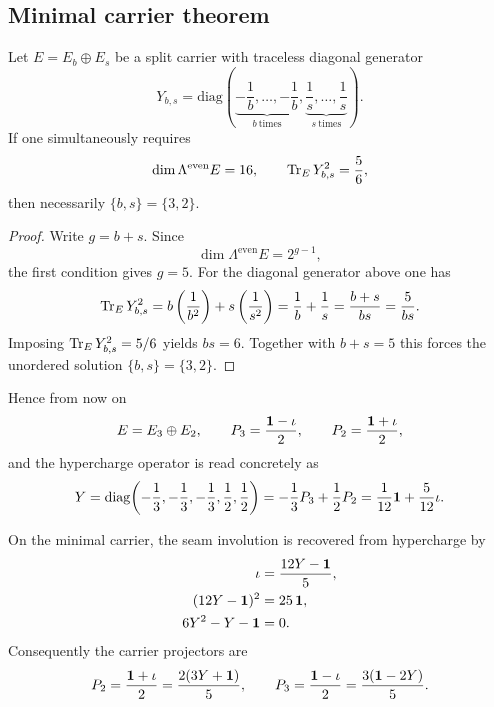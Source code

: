 \subsection{Minimal carrier theorem}
\label{sec:minimal-carrier-proof}

\begin{theorem}
Let $E=E_b\oplus E_s$ be a split carrier with traceless diagonal generator
\[
Y_{b,s}
=
\mathrm{diag}\!\left(
\underbrace{-\frac1b,\ldots,-\frac1b}_{b\ \text{times}},
\underbrace{\frac1s,\ldots,\frac1s}_{s\ \text{times}}
\right).
\]
If one simultaneously requires
\begin{equation}
\label{eq:minimal-carrier-conditions}
\dim \Lambda^{\mathrm{even}}E=16,
\qquad
\operatorname{Tr}_E Y_{b,s}^2=\frac56,
\end{equation}
then necessarily $\{b,s\}=\{3,2\}$.
\end{theorem}

\begin{proof}
Write $g=b+s$. Since
\[
\dim \Lambda^{\mathrm{even}}E=2^{g-1},
\]
the first condition gives $g=5$. For the diagonal generator above one has
\[
\operatorname{Tr}_E Y_{b,s}^2
=
b\left(\frac{1}{b^2}\right)+s\left(\frac{1}{s^2}\right)
=
\frac1b+\frac1s
=
\frac{b+s}{bs}
=
\frac{5}{bs}.
\]
Imposing $\operatorname{Tr}_E Y_{b,s}^2=5/6$ yields $bs=6$. Together with $b+s=5$ this forces the unordered solution $\{b,s\}=\{3,2\}$.
\end{proof}

Hence from now on
\[
E=E_3\oplus E_2,
\qquad
P_3=\frac{\mathbf 1-\iota}{2},
\qquad
P_2=\frac{\mathbf 1+\iota}{2},
\]
and the hypercharge operator is read concretely as
\begin{equation}
\label{eq:explicit-hypercharge}
Y
=
\mathrm{diag}\!\left(-\frac13,-\frac13,-\frac13,\frac12,\frac12\right)
=
-\frac13 P_3+\frac12 P_2
=
\frac1{12}\mathbf 1+\frac5{12}\iota.
\end{equation}

\begin{lemma}
On the minimal carrier, the seam involution is recovered from hypercharge by
\begin{align}
\iota&=\frac{12Y-\mathbf 1}{5},
\label{eq:hypercharge-seam-inversion}\\
(12Y-\mathbf 1)^2&=25\,\mathbf 1,
\nonumber\\
6Y^2-Y-\mathbf 1&=0.
\label{eq:carrier-polynomial}
\end{align}
Consequently the carrier projectors are
\[
P_2=\frac{\mathbf 1+\iota}{2}=\frac{2(3Y+\mathbf 1)}{5},
\qquad
P_3=\frac{\mathbf 1-\iota}{2}=\frac{3(\mathbf 1-2Y)}{5}.
\]
\end{lemma}

